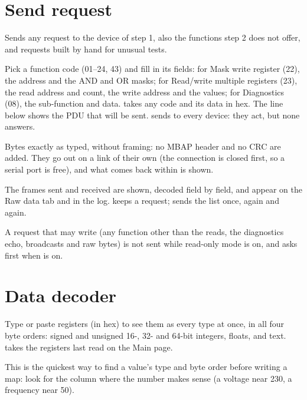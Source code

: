\section{Send request}
\label{sec:send-request}

Sends any request to the device of step 1, also the functions step 2 does not
offer, and requests built by hand for unusual tests.

\begin{description}[style=nextline, leftmargin=0pt, font=\intermedium]
  \item[Function] Pick a function code (01--24, 43) and fill in its fields:
    for Mask write register (22), the address and the AND and OR masks; for
    Read/write multiple registers (23), the read address and count, the write
    address and the values; for Diagnostics (08), the sub-function and data.
     takes any code and its data in hex. The line
    below shows the PDU that will be sent.  sends to
    every device: they act, but none answers.
  \item[Raw bytes] Bytes exactly as typed, without framing: no MBAP header and
    no CRC are added. They go out on a link of their own (the connection is
    closed first, so a serial port is free), and what comes back within
     is shown.
\end{description}

The frames sent and received are shown, decoded field by field, and appear on
the Raw data tab and in the log.  keeps a request;
 sends the list once,  again and again.

A request that may write (any function other than the reads, the diagnostics
echo, broadcasts and raw bytes) is not sent while read-only mode is on, and
asks first when  is on.

\section{Data decoder}
\label{sec:data-decoder}

Type or paste registers (in hex) to see them as every type at once, in all
four byte orders: signed and unsigned 16-, 32- and 64-bit integers, floats,
and text.  takes the registers last read on the Main page.

This is the quickest way to find a value's type and byte order before
writing a map: look for the column where the number makes sense (a voltage
near 230, a frequency near 50).


